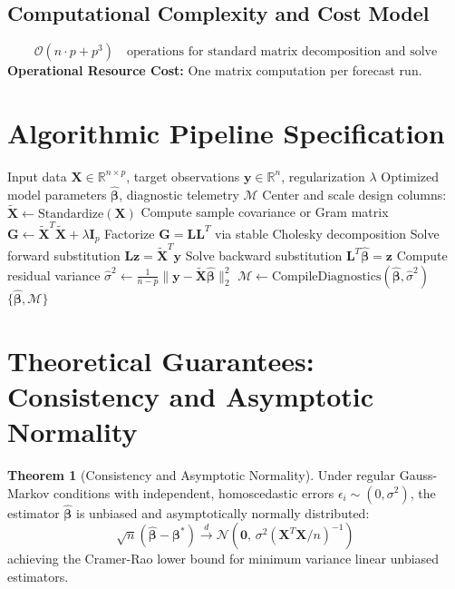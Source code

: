\documentclass[11pt,a4paper]{article}
\theoremstyle{definition}
\newtheorem{theorem}{\textbf{Theorem}}[section]
\begin{document}
\subsection{Computational Complexity and Cost Model}
\begin{equation}
\mathcal{O}(n \cdot p + p^3) \quad \text{operations for standard matrix decomposition and solve}
\end{equation}
\textbf{Operational Resource Cost:} One matrix computation per forecast run.

\section{Algorithmic Pipeline Specification}

\begin{algorithm}[H]
\caption{Hierarchical forecast reconciliation Execution}
\begin{algorithmic}[1]
\Require Input data $\mathbf{X} \in \mathbb{R}^{n \times p}$, target observations $\mathbf{y} \in \mathbb{R}^n$, regularization $\lambda$
\Ensure Optimized model parameters $\hat{\boldsymbol{\beta}}$, diagnostic telemetry $\mathcal{M}$
\State Center and scale design columns: $\tilde{\mathbf{X}} \gets \text{Standardize}(\mathbf{X})$
\State Compute sample covariance or Gram matrix $\mathbf{G} \gets \tilde{\mathbf{X}}^T \tilde{\mathbf{X}} + \lambda \mathbf{I}_p$
\State Factorize $\mathbf{G} = \mathbf{L} \mathbf{L}^T$ via stable Cholesky decomposition
\State Solve forward substitution $\mathbf{L} \mathbf{z} = \tilde{\mathbf{X}}^T \mathbf{y}$
\State Solve backward substitution $\mathbf{L}^T \hat{\boldsymbol{\beta}} = \mathbf{z}$
\State Compute residual variance $\hat{\sigma}^2 \gets \frac{1}{n - p} \| \mathbf{y} - \tilde{\mathbf{X}} \hat{\boldsymbol{\beta}} \|_2^2$
\State $\mathcal{M} \gets \text{CompileDiagnostics}(\hat{\boldsymbol{\beta}}, \hat{\sigma}^2)$
\State \Return $\{\hat{\boldsymbol{\beta}}, \mathcal{M}\}$
\end{algorithmic}
\end{algorithm}

\section{Theoretical Guarantees: Consistency and Asymptotic Normality}

\begin{theorem}[Consistency and Asymptotic Normality]
Under regular Gauss-Markov conditions with independent, homoscedastic errors $\epsilon_i \sim (0, \sigma^2)$, the estimator $\hat{\boldsymbol{\beta}}$ is unbiased and asymptotically normally distributed:
\begin{equation}
\sqrt{n}(\hat{\boldsymbol{\beta}} - \boldsymbol{\beta}^*) \xrightarrow{d} \mathcal{N}\left(\mathbf{0}, \, \sigma^2 (\mathbf{X}^T \mathbf{X} / n)^{-1}\right)
\end{equation}
achieving the Cramer-Rao lower bound for minimum variance linear unbiased estimators.
\end{theorem}
\end{document}
